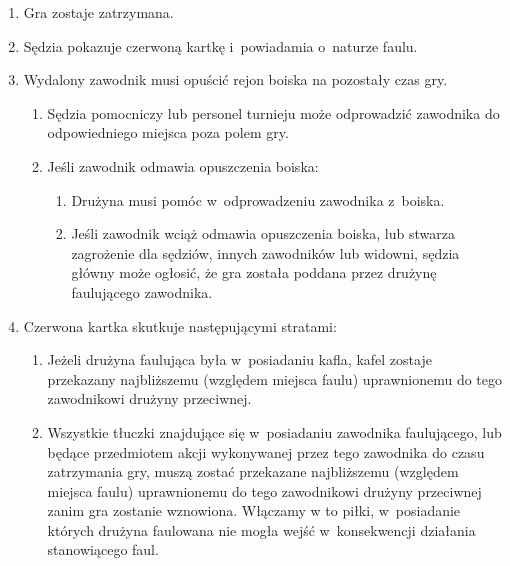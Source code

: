 \documentclass[12pt,a4paper]{article}
\begin{document}
\begin{enumerate}
	\item
	      Gra zostaje zatrzymana.
	\item
	      Sędzia pokazuje czerwoną kartkę i~powiadamia o~naturze faulu.
	\item
	      Wydalony zawodnik musi opuścić rejon boiska na pozostały czas gry.

	      \begin{enumerate}
		      \item
		            Sędzia pomocniczy lub personel turnieju może odprowadzić zawodnika
		            do odpowiedniego miejsca poza polem gry.
		      \item
		            Jeśli zawodnik odmawia opuszczenia boiska:

		            \begin{enumerate}
			            \item
			                  Drużyna musi pomóc w~odprowadzeniu zawodnika z~boiska.
			            \item
			                  Jeśli zawodnik wciąż odmawia opuszczenia boiska, lub stwarza
			                  zagrożenie dla sędziów, innych zawodników lub widowni, sędzia
			                  główny może ogłosić, że gra została poddana przez drużynę
			                  faulującego zawodnika.
		            \end{enumerate}
	      \end{enumerate}
	\item
	      Czerwona kartka skutkuje następującymi stratami:

	      \begin{enumerate}
		      \item
		            Jeżeli drużyna faulująca była w~posiadaniu kafla, kafel zostaje
		            przekazany najbliższemu (względem miejsca faulu)
		            uprawnionemu do tego zawodnikowi drużyny przeciwnej.
		      \item
				Wszystkie tłuczki znajdujące się w~posiadaniu zawodnika faulującego, lub
				będące przedmiotem akcji wykonywanej przez tego zawodnika do czasu zatrzymania gry, muszą
				zostać przekazane najbliższemu (względem miejsca faulu) uprawnionemu do tego zawodnikowi drużyny przeciwnej zanim gra
				zostanie wznowiona. Włączamy w to piłki, w~posiadanie których
				drużyna faulowana nie mogła wejść w~konsekwencji działania
				stanowiącego faul.


\end{enumerate}
\end{enumerate}
\end{document}
